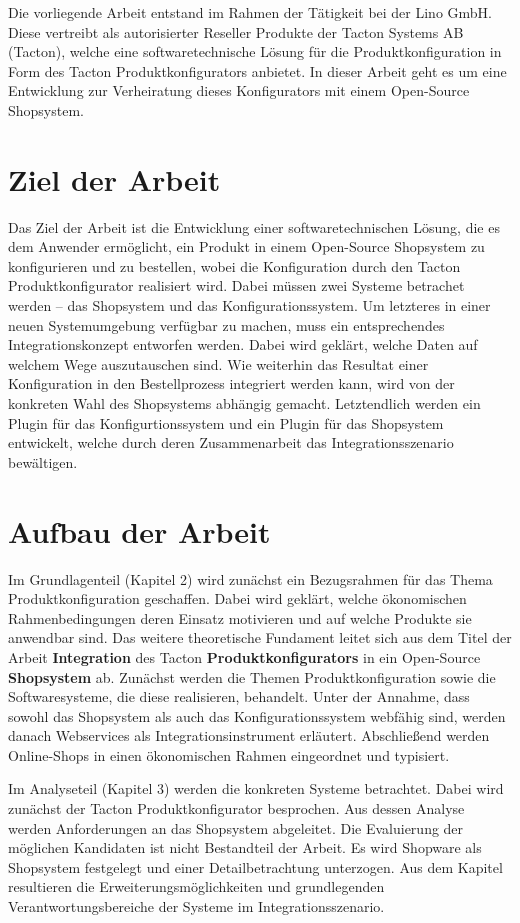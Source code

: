 \documentclass[11pt, a4paper, titlepage, listof=totoc, bibliography=totoc, index=totoc, twoside, openright, headings=normal, draft]{scrreprt}
\begin{document}
Die vorliegende Arbeit entstand im Rahmen der Tätigkeit bei der Lino GmbH. Diese vertreibt als autorisierter Reseller Produkte der Tacton Systems AB (Tacton), welche eine softwaretechnische Lösung für die Produktkonfiguration in Form des Tacton Produktkonfigurators anbietet. In dieser Arbeit geht es um eine Entwicklung zur Verheiratung dieses Konfigurators mit einem Open-Source Shopsystem.

\section{Ziel der Arbeit}
Das Ziel der Arbeit ist die Entwicklung einer softwaretechnischen Lösung, die es dem Anwender ermöglicht, ein Produkt in einem Open-Source Shopsystem zu konfigurieren und zu bestellen, wobei die Konfiguration durch den Tacton Produktkonfigurator realisiert wird. Dabei müssen zwei Systeme betrachet werden -- das Shopsystem und das Konfigurationssystem. Um letzteres in einer neuen Systemumgebung verfügbar zu machen, muss ein entsprechendes Integrationskonzept entworfen werden. Dabei wird geklärt, welche Daten auf welchem Wege auszutauschen sind. Wie weiterhin das Resultat einer Konfiguration in den Bestellprozess integriert werden kann, wird von der konkreten Wahl des Shopsystems abhängig gemacht. Letztendlich werden ein Plugin für das Konfigurtionssystem und ein Plugin für das Shopsystem entwickelt, welche durch deren Zusammenarbeit das Integrationsszenario bewältigen.

\section{Aufbau der Arbeit}
Im Grundlagenteil (Kapitel 2) wird zunächst ein Bezugsrahmen für das Thema Produktkonfiguration geschaffen. Dabei wird geklärt, welche ökonomischen Rahmenbedingungen deren Einsatz motivieren und auf welche Produkte sie anwendbar sind. Das weitere theoretische Fundament leitet sich aus dem Titel der Arbeit \glqq \textbf{Integration} des Tacton \textbf{Produktkonfigurators} in ein Open-Source \textbf{Shopsystem}\grqq{} ab. Zunächst werden die Themen Produktkonfiguration sowie die Softwaresysteme, die diese realisieren, behandelt. Unter der Annahme, dass sowohl das Shopsystem als auch das Konfigurationssystem webfähig sind, werden danach Webservices als Integrationsinstrument erläutert. Abschließend werden Online-Shops in einen ökonomischen Rahmen eingeordnet und typisiert. 

Im Analyseteil (Kapitel 3) werden die konkreten Systeme betrachtet. Dabei wird zunächst der Tacton Produktkonfigurator besprochen. Aus dessen Analyse werden Anforderungen an das Shopsystem abgeleitet. Die Evaluierung der möglichen Kandidaten ist nicht Bestandteil der Arbeit. Es wird Shopware als Shopsystem festgelegt und einer Detailbetrachtung unterzogen. Aus dem Kapitel resultieren die Erweiterungsmöglichkeiten und grundlegenden Verantwortungsbereiche der Systeme im Integrationsszenario.
\end{document}

